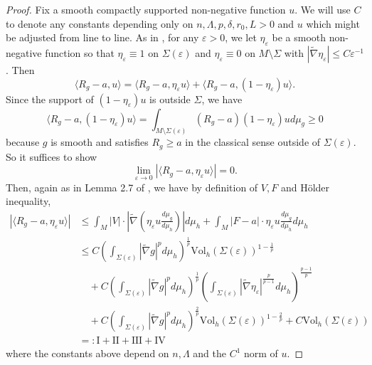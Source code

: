 \documentclass[12pt]{amsart}
\theoremstyle{plain}
\theoremstyle{plain}
\theoremstyle{definition}
\theoremstyle{remark}
\numberwithin{equation}{subsection}
\newcommand{\hdel}{\tilde{\nabla}}
\begin{document}
\begin{proof}
Fix a smooth compactly supported non-negative  function $u$. 
We will use $C$ to denote any constants depending only on $n,\Lambda,p,\delta,r_0,L>0$ and $u$ which might be adjusted from line to line.  As in \cite{jiang_removable_2022}, for any $\varepsilon > 0$, we let $\eta_\varepsilon$ be a smooth non-negative function so that $\eta_\varepsilon \equiv 1$ on $\Sigma(\varepsilon)$ and $\eta_\varepsilon \equiv 0$ on $M\setminus\Sigma$ with $|\hdel \eta_\varepsilon|\leq C\varepsilon^{-1}$. Then
    \begin{equation*}
        \langle R_{g} - a, u\rangle = \langle R_g - a, \eta_\varepsilon u\rangle + \langle R_g - a, (1-\eta_\varepsilon)u\rangle.
    \end{equation*}
    Since the support of $(1-\eta_\varepsilon)u$ is outside $\Sigma$, we have
    \begin{equation*}
        \langle R_g - a, (1-\eta_\varepsilon)u\rangle = \int_{M\setminus \Sigma(\varepsilon)} (R_g - a)(1-\eta_\varepsilon)u d\mu_g \geq 0
    \end{equation*}
    because $g$ is smooth and satisfies $R_g \geq a$ in the classical sense outside of $\Sigma(\varepsilon)$. So it suffices to show
    \begin{equation*}
        \lim\limits_{\varepsilon \to 0}\left|\langle R_g - a,\eta_\varepsilon u\rangle\right| = 0.
    \end{equation*}
    Then, again as in Lemma 2.7 of \cite{jiang_removable_2022}, we have by definition of $V, F$ and H\"older inequality,
    \begin{align}\label{eqn:distributional-scalar-curvature-integral-estimate}
        \left|\langle R_g - a,\eta_\varepsilon u\rangle\right| & \leq \int_M |V| \cdot \left| \hdel \left(\eta_\varepsilon u \frac{d\mu_g}{d\mu_h}\right)\right| d\mu_h + \int_M |F - a|\cdot \eta_\varepsilon u \frac{d\mu_g}{d\mu_h}d\mu_h \nonumber \\
        &\leq C\left(\int_{\Sigma(\varepsilon)}|\hdel g|^pd\mu_h\right)^\frac{1}{p}\text{Vol}_h(\Sigma(\varepsilon))^{1-\frac{1}{p}} \nonumber \\
        &\quad + C\left(\int_{\Sigma(\varepsilon)}|\hdel g|^pd\mu_h\right)^\frac{1}{p}\left(\int_{\Sigma(\varepsilon)}|\hdel\eta_\varepsilon|^\frac{p}{p-1}d\mu_h\right)^\frac{p-1}{p} \nonumber \\
        &\quad + C\left(\int_{\Sigma(\varepsilon)}|\hdel g|^pd\mu_h\right)^\frac{2}{p}\text{Vol}_h(\Sigma(\varepsilon))^{1-\frac{2}{p}} + C\text{Vol}_h(\Sigma(\varepsilon)) \nonumber \\
        &=: \text{I} + \text{II} + \text{III} + \text{IV}
    \end{align}
    where the constants above depend on $n,\Lambda$ and the $C^1$ norm of $u$.
    

\end{proof}
\end{document}
